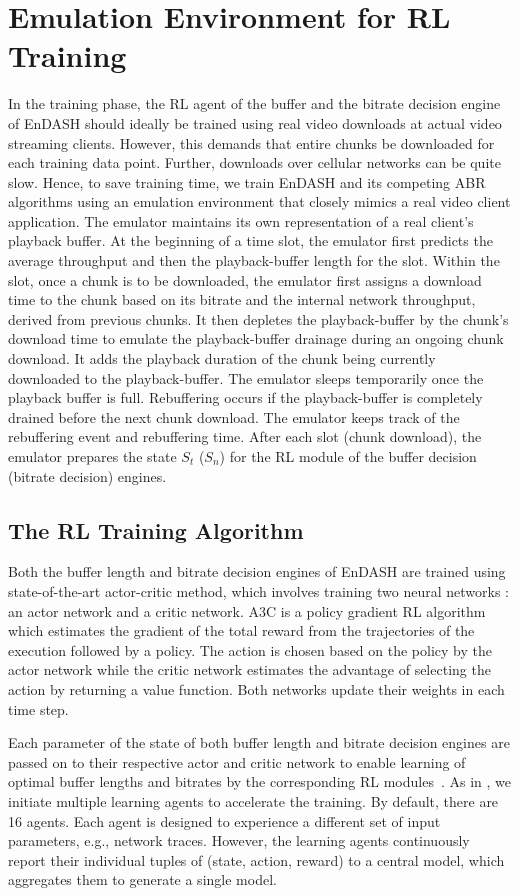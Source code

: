 \section{Emulation Environment for \ac{RL} Training}
In the training phase, the \ac{RL} agent of the buffer and the bitrate decision engine of EnDASH should ideally be trained using real video downloads at actual video streaming clients. 
However, this demands that entire chunks be downloaded for each training data point. Further, downloads over cellular networks can be quite slow. Hence, to save training time, we train EnDASH and its competing  ABR algorithms using an emulation environment that closely mimics a real video client application. The emulator maintains its own representation of a real client's playback buffer. At the beginning of a time slot, the emulator first predicts the average throughput and then the playback-buffer length for the slot. Within the slot, once a chunk is to be downloaded, the emulator first assigns a download time to the chunk based  on its bitrate and the internal network throughput, derived from previous chunks. It then depletes the playback-buffer by the chunk's download time to emulate the playback-buffer drainage during an ongoing chunk download. It adds the playback duration of the  chunk being currently downloaded to the playback-buffer. The emulator sleeps temporarily once the playback buffer is full. Rebuffering occurs if the playback-buffer is completely drained before the next chunk download. The emulator keeps track of the rebuffering event and rebuffering time. After each slot (chunk download), the emulator prepares the state $S_t$ ($S_n$) for the \ac{RL} module of the buffer decision (bitrate decision) engines.
\subsection{The \ac{RL} Training Algorithm}
Both the buffer length and bitrate decision engines of EnDASH are trained using  state-of-the-art actor-critic method, which involves training two neural networks \cite{mao2017neural}: an actor network and a critic network. A3C is a policy gradient \ac{RL} algorithm which estimates the gradient of the total reward from the trajectories of the execution followed by a policy. The action is chosen based on the policy by the actor network while the critic network estimates the advantage of selecting the action by returning a value function. Both networks update their weights in each time step.
 
\indent Each parameter of the state  of both buffer length and bitrate decision engines are passed on to their respective actor and critic network to enable learning of optimal buffer lengths and bitrates by the corresponding \ac{RL} modules~\cite{mao2017neural}.
As in \cite{mao2017neural}, we initiate multiple learning agents to accelerate the training. By default, there are 16 agents. Each agent is designed to experience a different set of input parameters, e.g., network traces. However, the learning agents continuously report  their individual tuples of (state, action, reward)  to a central model, which aggregates them to generate a single model.
